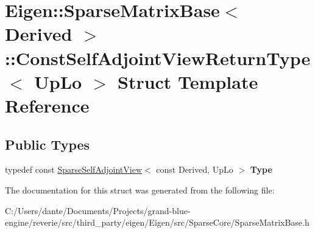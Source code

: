 \hypertarget{struct_eigen_1_1_sparse_matrix_base_1_1_const_self_adjoint_view_return_type}{}\section{Eigen\+::Sparse\+Matrix\+Base$<$ Derived $>$\+::Const\+Self\+Adjoint\+View\+Return\+Type$<$ Up\+Lo $>$ Struct Template Reference}
\label{struct_eigen_1_1_sparse_matrix_base_1_1_const_self_adjoint_view_return_type}
\subsection*{Public Types}
\begin{DoxyCompactItemize}
\item 
\mbox{\label{struct_eigen_1_1_sparse_matrix_base_1_1_const_self_adjoint_view_return_type_a1cc602fd26edeeaeb8d0d671230f7c2d}} 
typedef const \mbox{\hyperlink{class_eigen_1_1_sparse_self_adjoint_view}{Sparse\+Self\+Adjoint\+View}}$<$ const Derived, Up\+Lo $>$ {\bfseries Type}
\end{DoxyCompactItemize}


The documentation for this struct was generated from the following file\+:\begin{DoxyCompactItemize}
\item 
C\+:/\+Users/dante/\+Documents/\+Projects/grand-\/blue-\/engine/reverie/src/third\+\_\+party/eigen/\+Eigen/src/\+Sparse\+Core/Sparse\+Matrix\+Base.\+h\end{DoxyCompactItemize}
